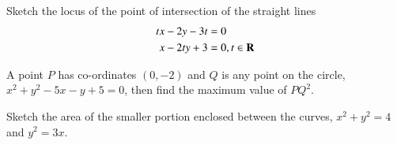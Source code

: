\documentclass[journal,12pt,twocolumn]{IEEEtran}
\begin{document}
\begin{problem}
Sketch the locus of the point of 
intersection of the straight lines
%
\begin{equation}
\begin{split}
tx - 2y - 3t &= 0
\\
x - 2ty + 3 &= 0, t \in \mathbf{R}
\end{split}
\end{equation}
%
\end{problem}
%
%
%
\begin{problem}
A point $P$ has co-ordinates $(0, -2)$ and
$Q$ is any point on the circle,
$x^2+y^2-5x-y+5=0$, then find the maximum
value of $PQ^2$. 
\end{problem}
%
%
\begin{problem}
Sketch the area of the smaller portion
enclosed between the curves, $x^2+y^2=4$
and $y^2=3x$.
\end{problem}
\end{document}
